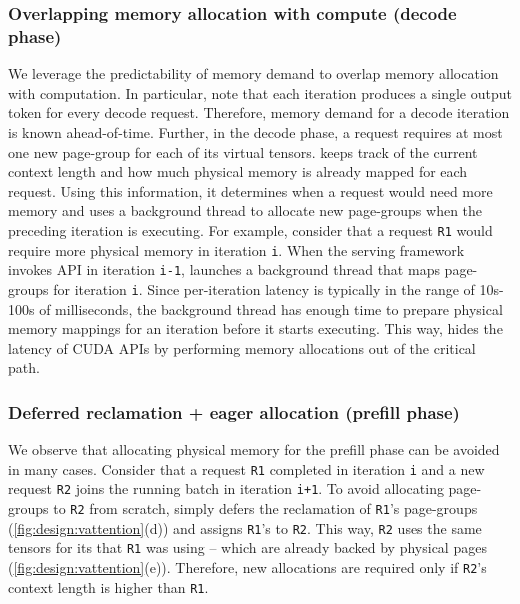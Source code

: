 \subsubsection{Overlapping memory allocation with compute (decode phase)}
We leverage the predictability of memory demand to overlap memory allocation with computation. In particular, note that each iteration produces a single output token for every decode request. Therefore, memory demand for a decode iteration is known ahead-of-time. Further, in the decode phase, a request requires at most one new page-group for each of its virtual tensors.  \sysname keeps track of the current context length and how much physical memory is already mapped for each request. Using this information, it determines when a request would need more memory and uses a background thread to allocate new page-groups when the preceding iteration is executing. For example, consider that a request \texttt{R1} would require more physical memory in iteration \texttt{i}. When the serving framework invokes \vattnstep API in iteration \texttt{i-1}, \sysname launches a background thread that maps page-groups for iteration \texttt{i}. Since per-iteration latency is typically in the range of 10s-100s of milliseconds, the background thread has enough time to prepare physical memory mappings for an iteration before it starts executing. This way, \sysname hides the latency of CUDA APIs by performing memory allocations out of the critical path. %



\subsubsection{Deferred reclamation + eager allocation (prefill phase)}
\label{sec:opt:defer}
We observe that allocating physical memory for the prefill phase can be avoided in many cases. Consider that a request \texttt{R1} completed in iteration \texttt{i} and a new request \texttt{R2} joins the running batch in iteration \texttt{i+1}. To avoid allocating page-groups to \texttt{R2} from scratch, \sysname simply defers the reclamation of \texttt{R1}'s page-groups (\autoref{fig:design:vattention}(d)) and assigns \texttt{R1}'s \reqid to \texttt{R2}. This way, \texttt{R2} uses the same tensors for its \kvcache that \texttt{R1} was using -- which are already backed by physical pages (\autoref{fig:design:vattention}(e)). Therefore, new allocations are required only if \texttt{R2}'s context length is higher than \texttt{R1}.

